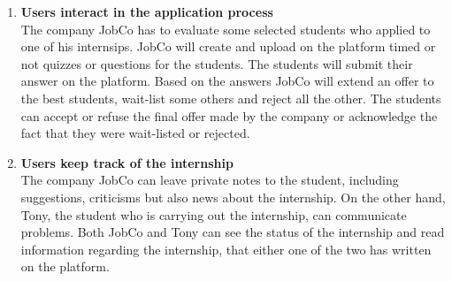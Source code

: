 \begin{enumerate}
\item \textbf{Users interact in the application process}
\\ The company JobCo has to evaluate some selected students who applied to one of his internsips. JobCo will create and upload on the platform timed or not quizzes or questions for the students. The students will submit their answer on the platform. Based on the answers JobCo will extend an offer to the best students, wait-list some others and reject all the other. The students can accept or refuse the final offer made by the company or acknowledge the fact that they were wait-listed or rejected.

\item \textbf{Users keep track of the internship }
\\ The company JobCo can leave private notes to the student, including suggestions, criticisms but also news about the internship. On the other hand, Tony, the student who is carrying out the internship, can communicate problems. Both JobCo and Tony can see the status of the internship and read information regarding the internship, that either one of the two has written on the platform.
\end{enumerate}


